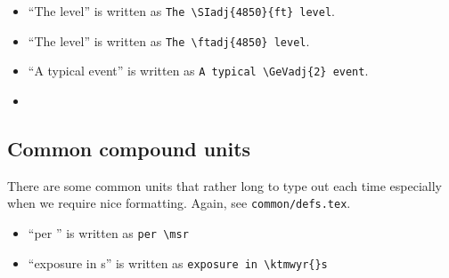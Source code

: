\begin{itemize}
\item ``The  level'' is written as \verb|The \SIadj{4850}{ft} level|.
\item ``The  level'' is written as \verb|The \ftadj{4850} level|.
\item ``A typical  event'' is written as \verb|A typical \GeVadj{2} event|.
\item 
\end{itemize}

\subsection{Common compound units}

There are some common units that rather long to type out each time
especially when we require nice formatting. Again, see \texttt{common/defs.tex}.

\begin{itemize}
\item ``per \msr'' is written as \verb|per \msr|
\item ``exposure in \ktmwyr{}s'' is written as \verb|exposure in \ktmwyr{}s|
\end{itemize}

